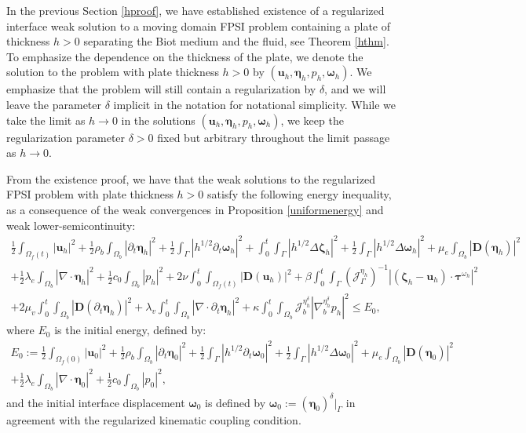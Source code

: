 \documentclass[11pt]{article}
\newcommand{\bd}{\boldsymbol}
\theoremstyle{definition}
\begin{document}
In the previous Section \ref{hproof}, we have established existence of a regularized interface weak solution to a moving domain FPSI problem containing a plate of thickness $h > 0$ separating the Biot medium and the fluid, see Theorem \ref{hthm}. To emphasize the dependence on the thickness of the plate, we denote the solution to the problem with plate thickness $h > 0$ by $(\bd{u}_{h}, \bd{\eta}_{h}, p_{h}, \bd{\omega}_{h})$. We emphasize that the problem will still contain a regularization by $\delta$, and we will leave the parameter $\delta$ implicit in the notation for notational simplicity. While we take the limit as $h \to 0$ in the solutions $(\bd{u}_{h}, \bd{\eta}_{h}, p_{h}, \bd{\omega}_{h})$, we keep the regularization parameter $\delta > 0$ fixed but arbitrary throughout the limit passage as $h \to 0$.

From the existence proof, we have that the weak solutions to the regularized FPSI problem with plate thickness $h > 0$ satisfy the following energy inequality, as a consequence of the weak convergences in Proposition \ref{uniformenergy} and weak lower-semicontinuity:
\begin{multline}\label{energyhineq}
\frac{1}{2} \int_{\Omega_{f}(t)} |\bd{u}_{h}|^{2} + \frac{1}{2} \rho_{b} \int_{\Omega_{b}} |\partial_{t} \bd{\eta}_{h}|^{2} + \frac{1}{2} \int_{\Gamma} \left|h^{1/2} \partial_{t}\bd{\omega}_{h}\right|^{2} + \int_{0}^{t} \int_{\Gamma} \left|h^{1/2} \Delta \bd{\zeta}_{h}\right|^{2} + \frac{1}{2} \int_{\Gamma} \left|h^{1/2} \Delta \bd{\omega}_{h}\right|^{2} + \mu_{e} \int_{\Omega_{b}} |\bd{D}(\bd{\eta}_{h})|^{2} \\
+ \frac{1}{2} \lambda_{e} \int_{\Omega_{b}} |\nabla \cdot \bd{\eta}_{h}|^{2} + \frac{1}{2} c_{0} \int_{\Omega_{b}} |p_{h}|^{2} + 2\nu \int_{0}^{t} \int_{\Omega_{f}(t)} |\bd{D}(\bd{u}_{h})|^{2} + \beta \int_{0}^{t} \int_{\Gamma} \left(\mathcal{J}_{\Gamma}^{\eta_{h}}\right)^{-1} \left|\left(\bd{\zeta}_{h} - \bd{u}_{h}\right) \cdot \bd{\tau}^{\omega_{h}}\right|^{2} \\
+ 2\mu_{v} \int_{0}^{t} \int_{\Omega_{b}} |\bd{D}(\partial_{t}\bd{\eta}_{h})|^{2} + \lambda_{v} \int_{0}^{t} \int_{\Omega_{b}} |\nabla \cdot \partial_{t}\bd{\eta}_{h}|^{2} + \kappa \int_{0}^{t} \int_{\Omega_{b}} \mathcal{J}^{\eta^{\delta}_{h}}_{b} \left|\nabla^{\eta^{\delta}_{h}}_{b} p_{h}\right|^{2} \le E_{0},
\end{multline}
where $E_{0}$ is the initial energy, defined by:
\begin{multline*}
E_{0} := \frac{1}{2} \int_{\Omega_{f}(0)} |\bd{u}_{0}|^{2} + \frac{1}{2}\rho_{b} \int_{\Omega_{b}} |\partial_{t}\bd{\eta}_{0}|^{2} + \frac{1}{2} \int_{\Gamma} |h^{1/2} \partial_{t}\bd{\omega}_{0}|^{2} + \frac{1}{2} \int_{\Gamma} \left|h^{1/2} \Delta \bd{\omega}_{0}\right|^{2} + \mu_{e} \int_{\Omega_{b}} |\bd{D}(\bd{\eta}_{0})|^{2} \\
+ \frac{1}{2} \lambda_{e} \int_{\Omega_{b}} |\nabla \cdot \bd{\eta}_{0}|^{2} + \frac{1}{2} c_{0} \int_{\Omega_{b}} |p_{0}|^{2},
\end{multline*}
and the initial interface displacement $\bd{\omega}_{0}$ is defined by $\bd{\omega}_{0} := (\bd{\eta}_{0})^{\delta}|_{\Gamma}$ in agreement with the regularized kinematic coupling condition.
\end{document}
